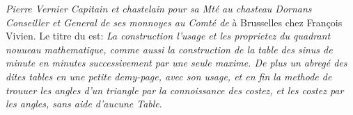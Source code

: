 \textit{Pierre Vernier}\protect{} \textit{Capitain et chastelain pour sa Mt\'{e}}\protect{} \textit{au chasteau Dornans}\protect{} \textit{Conseiller et General de ses monnoyes au Comt\'{e} de}  \`{a} Brusselles\protect{} chez Fran\c{c}ois Vivien\protect{}. Le titre du  est: \textit{La construction l'usage et les proprietez du quadrant\protect{} 
nouueau mathematique, comme aussi la construction de la table des sinus de minute en minutes successivement par une seule maxime. 
De plus un abreg\'{e} des dites tables en une petite demy-page, avec son usage, et en fin la methode de trouuer les angles d'un triangle par la connoissance des costez, et les costez par les angles, sans aide d'aucune Table}.
\\
\indent
